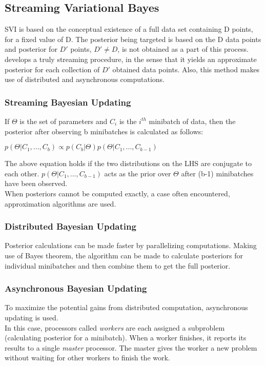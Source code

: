 \documentclass{article} %
\begin{document}
    \subsection{Streaming Variational Bayes}
       SVI is based on the conceptual existence of a full data set containing D points, for a fixed value of D. The posterior being targeted is based on the D data points and posterior for $D'$ points, $D' \neq D$, is not obtained as a part of this process.  
       \cite{streamVI} develops a truly streaming procedure, in the sense that it yields an approximate posterior for each collection of $D'$ obtained data points. Also, this method makes use of distributed and asynchronous computations. 
       
       \subsubsection{Streaming Bayesian Updating}
       If $\Theta$ is the set of parameters and $C_{i}$ is the $i^{th}$ minibatch of data, then the posterior after observing b minibatches is calculated as follows:
       
       \begin{center}$p(\Theta|C_{1},...,C_{b}) \propto p(C_{b}|\Theta)p(\Theta|C_{1},...,C_{b-1}) $
       \end{center}
       
       The above equation holds if the two distributions on the LHS are conjugate to each other. $p(\Theta|C_{1},...,C_{b-1})$ acts as the prior over $\Theta$ after (b-1) minibatches have been observed.\\
       When posteriors cannot be computed exactly, a case often encountered, approximation algorithms are used.
    
       \subsubsection{Distributed Bayesian Updating}
       Posterior calculations can be made faster by parallelizing computations. Making use of Bayes theorem, the algorithm can be made to calculate posteriors for individual minibatches and then combine them to get the full posterior.
       
       \subsubsection{Asynchronous Bayesian Updating}
       To maximize the potential gains from distributed computation, asynchronous updating is used. \\
       In this case, processors called \textit{workers} are each assigned a subproblem (calculating posterior for a minibatch). When a worker finishes, it reports its results to a single \textit{master} processor. The master gives the worker a new problem without waiting for other workers to finish the work.
       
\end{document}
